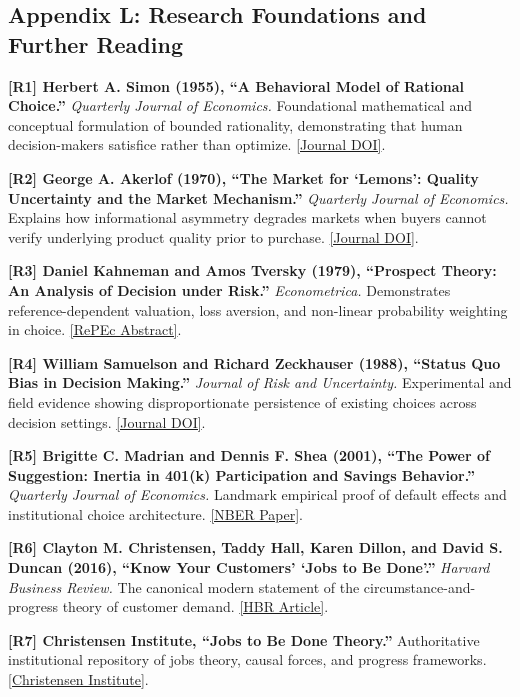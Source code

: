 \subsection*{Appendix L: Research Foundations and Further Reading}

\noindent\textbf{[R1] Herbert A. Simon (1955), ``A Behavioral Model of Rational Choice.''} \textit{Quarterly Journal of Economics.} Foundational mathematical and conceptual formulation of bounded rationality, demonstrating that human decision-makers satisfice rather than optimize. \href{https://doi.org/10.2307/1884852}{[Journal DOI]}.

\noindent\textbf{[R2] George A. Akerlof (1970), ``The Market for `Lemons': Quality Uncertainty and the Market Mechanism.''} \textit{Quarterly Journal of Economics.} Explains how informational asymmetry degrades markets when buyers cannot verify underlying product quality prior to purchase. \href{https://doi.org/10.2307/1879431}{[Journal DOI]}.

\noindent\textbf{[R3] Daniel Kahneman and Amos Tversky (1979), ``Prospect Theory: An Analysis of Decision under Risk.''} \textit{Econometrica.} Demonstrates reference-dependent valuation, loss aversion, and non-linear probability weighting in choice. \href{https://ideas.repec.org/a/ecm/emetrp/v47y1979i2p263-91.html}{[RePEc Abstract]}.

\noindent\textbf{[R4] William Samuelson and Richard Zeckhauser (1988), ``Status Quo Bias in Decision Making.''} \textit{Journal of Risk and Uncertainty.} Experimental and field evidence showing disproportionate persistence of existing choices across decision settings. \href{https://doi.org/10.1007/BF00055564}{[Journal DOI]}.

\noindent\textbf{[R5] Brigitte C. Madrian and Dennis F. Shea (2001), ``The Power of Suggestion: Inertia in 401(k) Participation and Savings Behavior.''} \textit{Quarterly Journal of Economics.} Landmark empirical proof of default effects and institutional choice architecture. \href{https://www.nber.org/papers/w7682}{[NBER Paper]}.

\noindent\textbf{[R6] Clayton M. Christensen, Taddy Hall, Karen Dillon, and David S. Duncan (2016), ``Know Your Customers' `Jobs to Be Done'.''} \textit{Harvard Business Review.} The canonical modern statement of the circumstance-and-progress theory of customer demand. \href{https://hbr.org/2016/09/know-your-customers-jobs-to-be-done}{[HBR Article]}.

\noindent\textbf{[R7] Christensen Institute, ``Jobs to Be Done Theory.''} Authoritative institutional repository of jobs theory, causal forces, and progress frameworks. \href{https://www.christenseninstitute.org/theory/jobs-to-be-done/}{[Christensen Institute]}.

